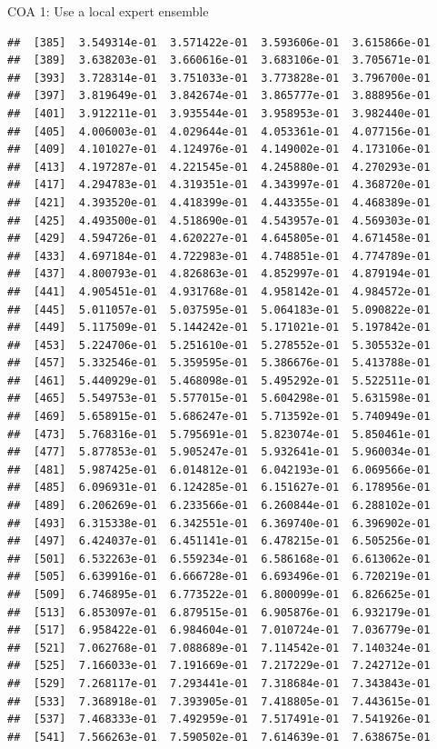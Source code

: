 \documentclass[ignorenonframetext,]{beamer}
\begin{document}
\begin{frame}[fragile]{COA 1: Use a local expert ensemble}
\begin{verbatim}
##  [385]  3.549314e-01  3.571422e-01  3.593606e-01  3.615866e-01
##  [389]  3.638203e-01  3.660616e-01  3.683106e-01  3.705671e-01
##  [393]  3.728314e-01  3.751033e-01  3.773828e-01  3.796700e-01
##  [397]  3.819649e-01  3.842674e-01  3.865777e-01  3.888956e-01
##  [401]  3.912211e-01  3.935544e-01  3.958953e-01  3.982440e-01
##  [405]  4.006003e-01  4.029644e-01  4.053361e-01  4.077156e-01
##  [409]  4.101027e-01  4.124976e-01  4.149002e-01  4.173106e-01
##  [413]  4.197287e-01  4.221545e-01  4.245880e-01  4.270293e-01
##  [417]  4.294783e-01  4.319351e-01  4.343997e-01  4.368720e-01
##  [421]  4.393520e-01  4.418399e-01  4.443355e-01  4.468389e-01
##  [425]  4.493500e-01  4.518690e-01  4.543957e-01  4.569303e-01
##  [429]  4.594726e-01  4.620227e-01  4.645805e-01  4.671458e-01
##  [433]  4.697184e-01  4.722983e-01  4.748851e-01  4.774789e-01
##  [437]  4.800793e-01  4.826863e-01  4.852997e-01  4.879194e-01
##  [441]  4.905451e-01  4.931768e-01  4.958142e-01  4.984572e-01
##  [445]  5.011057e-01  5.037595e-01  5.064183e-01  5.090822e-01
##  [449]  5.117509e-01  5.144242e-01  5.171021e-01  5.197842e-01
##  [453]  5.224706e-01  5.251610e-01  5.278552e-01  5.305532e-01
##  [457]  5.332546e-01  5.359595e-01  5.386676e-01  5.413788e-01
##  [461]  5.440929e-01  5.468098e-01  5.495292e-01  5.522511e-01
##  [465]  5.549753e-01  5.577015e-01  5.604298e-01  5.631598e-01
##  [469]  5.658915e-01  5.686247e-01  5.713592e-01  5.740949e-01
##  [473]  5.768316e-01  5.795691e-01  5.823074e-01  5.850461e-01
##  [477]  5.877853e-01  5.905247e-01  5.932641e-01  5.960034e-01
##  [481]  5.987425e-01  6.014812e-01  6.042193e-01  6.069566e-01
##  [485]  6.096931e-01  6.124285e-01  6.151627e-01  6.178956e-01
##  [489]  6.206269e-01  6.233566e-01  6.260844e-01  6.288102e-01
##  [493]  6.315338e-01  6.342551e-01  6.369740e-01  6.396902e-01
##  [497]  6.424037e-01  6.451141e-01  6.478215e-01  6.505256e-01
##  [501]  6.532263e-01  6.559234e-01  6.586168e-01  6.613062e-01
##  [505]  6.639916e-01  6.666728e-01  6.693496e-01  6.720219e-01
##  [509]  6.746895e-01  6.773522e-01  6.800099e-01  6.826625e-01
##  [513]  6.853097e-01  6.879515e-01  6.905876e-01  6.932179e-01
##  [517]  6.958422e-01  6.984604e-01  7.010724e-01  7.036779e-01
##  [521]  7.062768e-01  7.088689e-01  7.114542e-01  7.140324e-01
##  [525]  7.166033e-01  7.191669e-01  7.217229e-01  7.242712e-01
##  [529]  7.268117e-01  7.293441e-01  7.318684e-01  7.343843e-01
##  [533]  7.368918e-01  7.393905e-01  7.418805e-01  7.443615e-01
##  [537]  7.468333e-01  7.492959e-01  7.517491e-01  7.541926e-01
##  [541]  7.566263e-01  7.590502e-01  7.614639e-01  7.638675e-01

\end{verbatim}
\end{frame}
\end{document}
